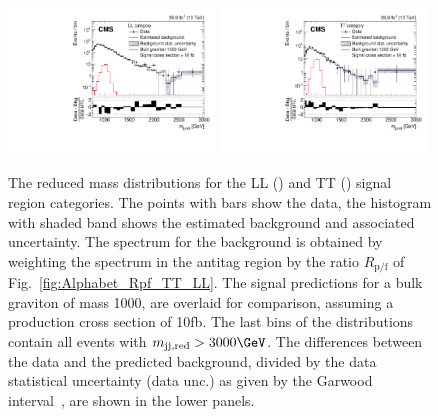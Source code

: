 \begin{figure}[htbp]
\centering
\includegraphics[width=0.49\textwidth]{B2G-16-026/Figure_006-a.pdf}
\includegraphics[width=0.49\textwidth]{B2G-16-026/Figure_006-b.pdf}
\caption{The reduced mass distributions \mjjs for the LL (\cmsLeft) and TT (\cmsRight) signal region categories. The points with bars show the data, the histogram with shaded band shows the estimated background and associated uncertainty. The \mjjs spectrum for the background is obtained by weighting the \mjjs spectrum in the antitag region by the ratio $R_\text{p/f}$  of Fig.~\ref{fig:Alphabet_Rpf_TT_LL}. The signal predictions for a bulk graviton of mass 1000\GeV, are overlaid for comparison, assuming a production cross section of 10\unit{fb}. The last bins of the distributions contain all events with $\mjjs > 3000\GeV$. The differences between the data and the predicted background, divided by the data statistical uncertainty (data unc.) as given by the Garwood interval~\cite{Garwood}, are shown in the lower panels.}
\label{fig:Alphabet_Bkg_TT_LL}
\end{figure}

